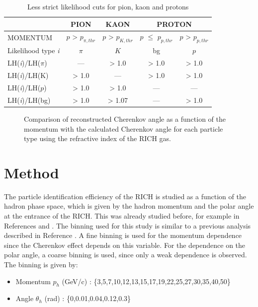 \begin{table}[!h]
  \caption{Less strict likelihood cuts for pion, kaon and protons}
  \label{tab:LHlessstrict}
  \centering
  \begin{tabular}{lcccc}
    \hline
     & PION & KAON & \multicolumn{2}{c}{PROTON} \\
    \hline
    MOMENTUM & $p$ > $p_{\pi,thr}$ & $p$ > $p_{K,thr}$ & $p$ $\leq$ $p_{p,thr}$ & $p$ > $p_{p,thr}$ \\
    Likelihood type \textit{i} & $\pi$ & $K$ & bg & $p$ \\
    LH(\textit{i})/LH($\pi$) & --- & > 1.0 & > 1.0 & > 1.0 \\
    LH(\textit{i})/LH(K) & > 1.0 & --- & > 1.0 & > 1.0 \\
    LH(\textit{i})/LH($p$) & > 1.0 & > 1.0 & --- & --- \\
    LH(\textit{i})/LH(bg) & > 1.0 & > 1.07 & --- & > 1.0 \\
    \hline
  \end{tabular}
\end{table}

\begin{figure}[!h]
  \centering
	\caption{Comparison of reconstructed Cherenkov angle as a function of the momentum with the calculated Cherenkov angle for each particle type using the refractive index of the RICH gas.}
	\label{pic:RefIndex}
\end{figure}

\section{Method}

The particle identification efficiency of the RICH is studied as a function of the hadron phase space, which is given by the hadron momentum and the polar angle at the entrance of the RICH. This was already studied before, for example in References \cite{} and \cite{}. The binning used for this study is similar to a previous analysis described in Reference \cite{}. A fine binning is used for the momentum dependence since the Cherenkov effect depends on this variable. For the dependence on the polar angle, a coarse binning is used, since only a weak dependence is observed. The binning is given by:

\begin{itemize}
  \item Momentum $p_h$ (GeV/c) : \{3,5,7,10,12,13,15,17,19,22,25,27,30,35,40,50\}
  \item Angle $\theta_h$ (rad) : \{0,0.01,0.04,0.12,0.3\}
\end{itemize}

